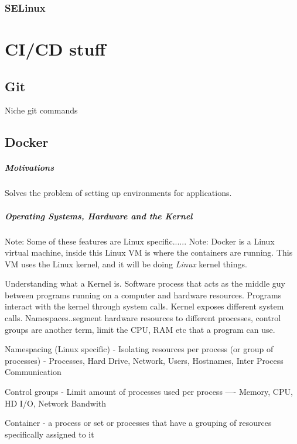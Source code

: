 \documentclass[a4paper, 11pt]{book}
\begin{document}
    \subsection{SELinux}


    \chapter{CI/CD stuff}


    \section{Git}

    Niche git commands


    \section{Docker}

    \paragraph{Motivations}
    Solves the problem of setting up environments for applications.

    \paragraph{Operating Systems, Hardware and the Kernel}
    Note: Some of these features are Linux specific......
    Note: Docker is a Linux virtual machine, inside this Linux VM is where the containers are running.
    This VM uses the Linux kernel, and it will be doing \textit{Linux} kernel things.

    Understanding what a Kernel is.
    Software process that acts as the middle guy between programs running on a computer and hardware resources.
    Programs interact with the kernel through system calls.
    Kernel exposes different system calls.
    Namespaces..segment hardware resources to different processes, control groups are another term, limit the CPU, RAM etc that a program can use.

    Namespacing (Linux specific) - Isolating resources per process (or group of processes) - Processes, Hard Drive, Network, Users, Hostnames, Inter Process Communication

    Control groups - Limit amount of processes used per process ---- Memory, CPU, HD I/O, Network Bandwith

    Container - a process or set or processes that have a grouping of resources specifically assigned to it
\end{document}

